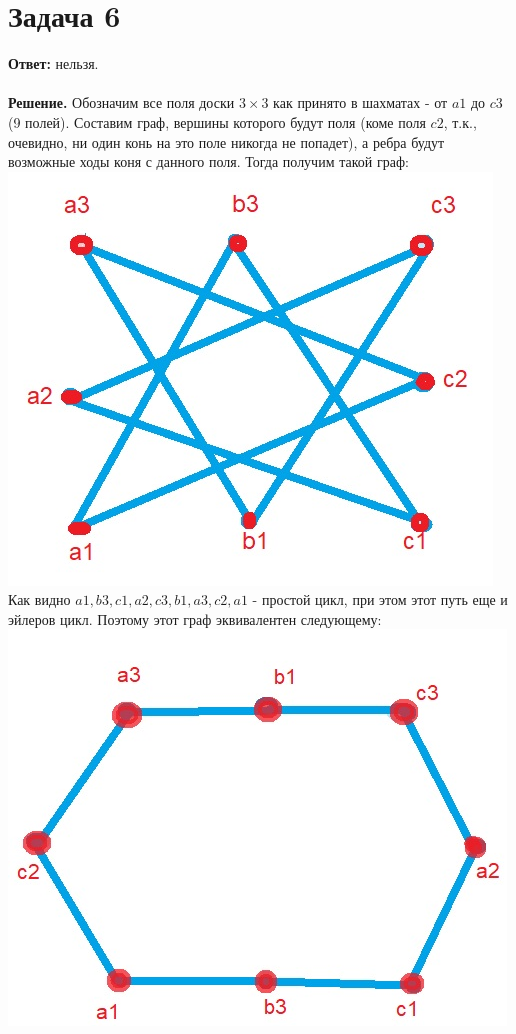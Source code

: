 \documentclass{article}
\begin{document}
\section*{Задача 6}
{\bf Ответ:} нельзя.
\\
\\
{\bf Решение.} Обозначим все поля доски $3\times3$ как принято в шахматах - от $a1$ до $c3$ (9 полей). Составим граф, вершины которого будут поля (коме поля $c2$, т.к., очевидно, ни один конь на это поле никогда не попадет), а ребра будут возможные ходы коня с данного поля. Тогда получим такой граф:
\\
{\includegraphics[scale=0.3]{img/img4.jpg}}
\\
Как видно $a1,b3,c1,a2,c3,b1,a3,c2, a1$ - простой цикл, при этом этот путь еще и эйлеров цикл. Поэтому этот граф эквивалентен следующему:
\\
{\includegraphics[scale=0.3]{img/img5.jpg}}
\end{document}
